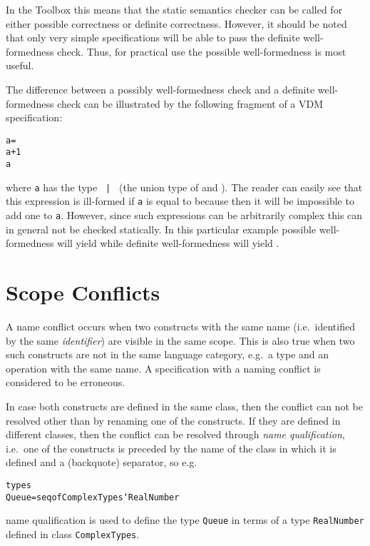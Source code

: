 \documentclass[\pformat,12pt]{article}
\begin{document}
In the Toolbox this means that the static semantics checker can be
called for either possible correctness or definite correctness.
However, it should be noted that only very simple specifications will
be able to pass the definite well-formed\-ness check. Thus, for
practical use the possible well-formedness is most useful.

The difference between a possibly well-formedness check and a definite
well-formedness check can be illustrated by the following
fragment of a VDM specification:
\begin{alltt}
    a =  
    a + 1 
     a
\end{alltt}
where {\tt a} has the type {\tt {} | } (the union
type of
 and
). The reader can easily see that this expression is
ill-formed if {\tt a} is equal to  because then it will be
impossible to add one to {\tt a}. However, since such expressions can
be arbitrarily complex this can in general not be checked statically. In
this particular example possible well-formedness will yield
 while definite well-formedness will yield .

\section{Scope Conflicts}
\label{sec:nameconflicts}

A name conflict occurs when two constructs with the same name
(i.e.\ identified by the same {\em identifier}) are visible in the
same scope.  This is also true when two such constructs are not in the
same language category, e.g.\ a type and an operation with the same name.
A specification with a naming conflict is considered to be erroneous.

In case both constructs are defined in the same class, then the conflict can
not be resolved other than by renaming one of the constructs.
If they are defined in different classes, then the conflict can be resolved
through {\em name qualification}, i.e.\ one of the constructs is
preceded by the name of the class in which it is defined and
a  (backquote) separator, so e.g.
  \begin{alltt}
    types
      Queue = seq of ComplexTypes`RealNumber
  \end{alltt}
name qualification is used to define the type {\tt Queue} in terms of a
type {\tt RealNumber} defined in class {\tt ComplexTypes}.
\end{document}

